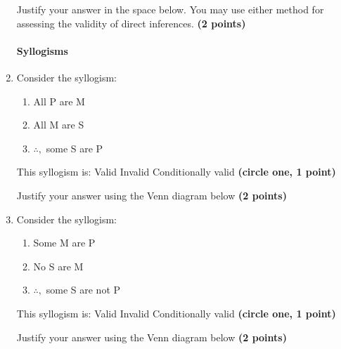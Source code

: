 \documentclass[10pt]{article}
\begin{document}
\begin{enumerate}
  \vspace{3mm}
  
  Justify your answer in the space below.  You may use either method for assessing the validity of direct inferences. \textbf{(2 points)}
  

\newpage

\paragraph{Syllogisms}

  \item Consider the syllogism:
    \begin{enumerate}[1)]
     \item All P are M
     \item All M are S
     \item $\therefore,$ some S are P
    \end{enumerate}

    This syllogism is: \hspace{1cm} Valid \hspace{1cm} Invalid \hspace{1cm} Conditionally valid \hspace{1cm} \textbf{(circle one, 1 point)}
    
    \vspace{3mm}
    
    Justify your answer using the Venn diagram below \textbf{(2 points)}
    
    \begin{center}
    \end{center}

  \item Consider the syllogism:
    \begin{enumerate}[1)]
     \item Some M are P
     \item No S are M
     \item $\therefore,$ some S are not P
    \end{enumerate}

    This syllogism is: \hspace{1cm} Valid \hspace{1cm} Invalid \hspace{1cm} Conditionally valid \hspace{1cm} \textbf{(circle one, 1 point)}
    
    \vspace{3mm}
    
    Justify your answer using the Venn diagram below \textbf{(2 points)}
    
    \begin{center}
    \end{center}
  
\end{enumerate}
  
\end{document}
